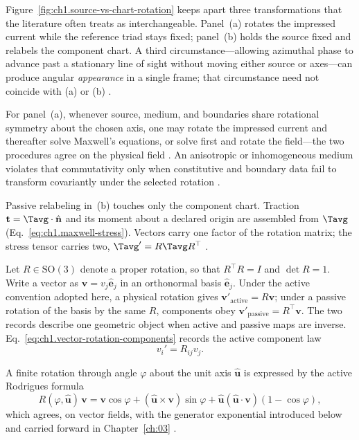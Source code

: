 Figure~\ref{fig:ch1.source-vs-chart-rotation} keeps apart three transformations that the literature often treats as interchangeable. Panel~(a) rotates the impressed current while the reference triad stays fixed; panel~(b) holds the source fixed and relabels the component chart. A third circumstance---allowing azimuthal phase to advance past a stationary line of sight without moving either source or axes---can produce angular \emph{appearance} in a single frame; that circumstance need not coincide with (a) or (b) \cite{hansen1988}.

For panel~(a), whenever source, medium, and boundaries share rotational symmetry about the chosen axis, one may rotate the impressed current and thereafter solve Maxwell's equations, or solve first and rotate the field---the two procedures agree on the physical field \cite{stratton1941,hansen1988}. An anisotropic or inhomogeneous medium violates that commutativity only when constitutive and boundary data fail to transform covariantly under the selected rotation \cite{stratton1941}.

Passive relabeling in~(b) touches only the component chart. Traction $\mathbf{t}=\Tavg\cdot\hat{\mathbf{n}}$ and its moment about a declared origin are assembled from $\Tavg$ (Eq.~\eqref{eq:ch1.maxwell-stress}). Vectors carry one factor of the rotation matrix; the stress tensor carries two, $\Tavg'=R\Tavg R^\top$ \cite{beth1936,stratton1941}.

Let $R\in\mathrm{SO}(3)$ denote a proper rotation, so that $R^\top R=I$ and $\det R=1$. Write a vector as $\mathbf{v}=v_j\hat{\mathbf{e}}_j$ in an orthonormal basis $\hat{\mathbf{e}}_j$. Under the active convention adopted here, a physical rotation gives $\mathbf{v}'_{\mathrm{active}}=R\mathbf{v}$; under a passive rotation of the basis by the same $R$, components obey $\mathbf{v}'_{\mathrm{passive}}=R^\top\mathbf{v}$. The two records describe one geometric object when active and passive maps are inverse. Eq.~\eqref{eq:ch1.vector-rotation-components} records the active component law
\begin{equation}
\label{eq:ch1.infinitesimal-active-rotation}v_i' = R_{ij}v_j.
\end{equation}
\addtocounter{equation}{-1}\label{eq:ch1.vector-rotation-components}%
\addtocounter{equation}{-1}\label{eq:ch1.active-rotation-action}%
A finite rotation through angle \(\varphi\) about the unit axis \(\hat{\mathbf{u}}\) is expressed by the active Rodrigues formula
\begin{equation}
\label{eq:ch1.rodrigues-rotation}
R(\varphi,\hat{\mathbf{u}})\,\mathbf{v}
=
\mathbf{v}\cos\varphi
+(\hat{\mathbf{u}}\times\mathbf{v})\sin\varphi
+\hat{\mathbf{u}}(\hat{\mathbf{u}}\cdot\mathbf{v})(1-\cos\varphi),
\end{equation}
which agrees, on vector fields, with the generator exponential introduced below and carried forward in Chapter~\ref{ch:03} \cite{jackson1999,stratton1941}.

